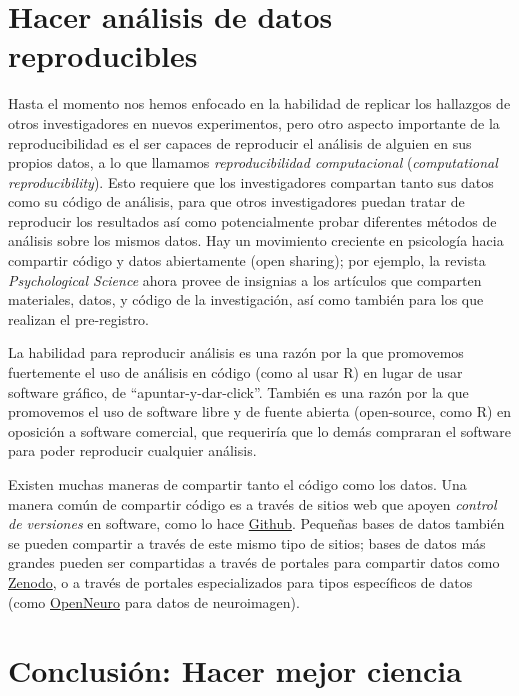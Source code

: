 \documentclass[
  12pt,
]{book}
\begin{document}
\hypertarget{hacer-anuxe1lisis-de-datos-reproducibles}{%
\section{Hacer análisis de datos reproducibles}\label{hacer-anuxe1lisis-de-datos-reproducibles}}

Hasta el momento nos hemos enfocado en la habilidad de replicar los hallazgos de otros investigadores en nuevos experimentos, pero otro aspecto importante de la reproducibilidad es el ser capaces de reproducir el análisis de alguien en sus propios datos, a lo que llamamos \emph{reproducibilidad computacional} (\emph{computational reproducibility}). Esto requiere que los investigadores compartan tanto sus datos como su código de análisis, para que otros investigadores puedan tratar de reproducir los resultados así como potencialmente probar diferentes métodos de análisis sobre los mismos datos. Hay un movimiento creciente en psicología hacia compartir código y datos abiertamente (open sharing); por ejemplo, la revista \emph{Psychological Science} ahora provee de insignias a los artículos que comparten materiales, datos, y código de la investigación, así como también para los que realizan el pre-registro.

La habilidad para reproducir análisis es una razón por la que promovemos fuertemente el uso de análisis en código (como al usar R) en lugar de usar software gráfico, de ``apuntar-y-dar-click''. También es una razón por la que promovemos el uso de software libre y de fuente abierta (open-source, como R) en oposición a software comercial, que requeriría que lo demás compraran el software para poder reproducir cualquier análisis.

Existen muchas maneras de compartir tanto el código como los datos. Una manera común de compartir código es a través de sitios web que apoyen \emph{control de versiones} en software, como lo hace \href{http://github.com}{Github}. Pequeñas bases de datos también se pueden compartir a través de este mismo tipo de sitios; bases de datos más grandes pueden ser compartidas a través de portales para compartir datos como \href{https://zenodo.org/}{Zenodo}, o a través de portales especializados para tipos específicos de datos (como \href{http://openneuro.org}{OpenNeuro} para datos de neuroimagen).

\hypertarget{conclusiuxf3n-hacer-mejor-ciencia}{%
\section{Conclusión: Hacer mejor ciencia}\label{conclusiuxf3n-hacer-mejor-ciencia}}
\end{document}
